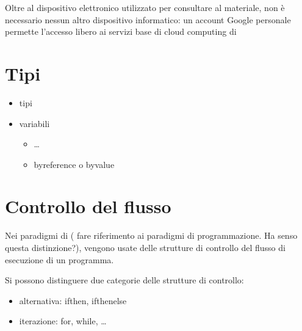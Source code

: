 \documentclass[letterpaper,10pt,english]{jupyterBook}
\begin{document}
\sphinxAtStartPar
Oltre al dispositivo elettronico utilizzato per consultare al materiale, non è necessario nessun altro dispositivo informatico: un account Google personale permette l’accesso libero ai servizi base di cloud computing di 

\sphinxstepscope


\chapter{Tipi}
\label{\detokenize{ch/programming/types:tipi}}\label{\detokenize{ch/programming/types::doc}}\begin{itemize}
\item {} 
\sphinxAtStartPar
tipi

\item {} 
\sphinxAtStartPar
variabili
\begin{itemize}
\item {} 
\sphinxAtStartPar
…

\item {} 
\sphinxAtStartPar
by\sphinxhyphen{}reference o by\sphinxhyphen{}value

\end{itemize}

\end{itemize}

\sphinxstepscope


\chapter{Controllo del flusso}
\label{\detokenize{ch/programming/flow_control:controllo-del-flusso}}\label{\detokenize{ch/programming/flow_control::doc}}
\sphinxAtStartPar
Nei paradigmi di  ( fare riferimento ai paradigmi di programmazione. Ha senso questa distinzione?), vengono usate delle strutture di controllo del flusso di esecuzione di un programma.

\sphinxAtStartPar
Si possono distinguere due categorie delle strutture di controllo:
\begin{itemize}
\item {} 
\sphinxAtStartPar
alternativa: if\sphinxhyphen{}then, if\sphinxhyphen{}then\sphinxhyphen{}else

\item {} 
\sphinxAtStartPar
iterazione: for, while, …

\end{itemize}
\end{document}
